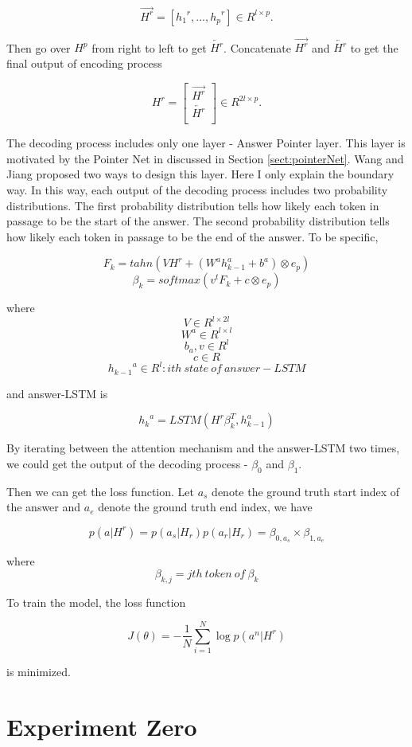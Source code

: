 \documentclass[modernstyle,12pt]{sjsuthesis}
\theoremstyle{definition}
\begin{document}
$$\overrightarrow{H^r} = [{{h_{1}}^r}, ..., {{h_{p}}^r}] \in R^{l \times p}.$$

Then go over $H^p$ from right to left to get $\overleftarrow{H^r}$. Concatenate $\overrightarrow{H^r}$ and $\overleftarrow{H^r}$ to get the final output of encoding process

\[ H^r =
\begin{bmatrix}
\overrightarrow{H^r} \\
\overleftarrow{H^r} \\
\end{bmatrix}
\in R^{2l \times p}.
\]

The decoding process includes only one layer - Answer Pointer layer. This layer is motivated by the Pointer Net in \cite{vinyals2015pointer} discussed in Section \ref{sect:pointerNet}. Wang and Jiang proposed two ways to design this layer. Here I only explain the boundary way. In this way, each output of the decoding process includes two probability distributions. The first probability distribution tells how likely each token in passage to be the start of the answer. The second probability distribution tells how likely each token in passage to be the end of the answer. To be specific,

$$F_k = tahn(VH^r + (W^a{h^a_{k-1}} +  b^a) \otimes e_p)$$
$$\beta _k = softmax(v^tF_k + c \otimes e_p)$$


where
$$V \in R^{l \times 2l}$$
$$W^a\in R^{l \times l} $$
$$b_a, v\in R^{l}  $$
$$c \in R $$
$${h_{k-1}}^a\in R^{l}: ith\ state\ of\ answer-LSTM  $$

and answer-LSTM is


$${h_k}^a = LSTM(H^r\beta _k^T, h_{k-1}^a)$$

By iterating between the attention mechanism and the answer-LSTM two times, we could get the output of the decoding process - $\beta _0$ and $\beta _1$.


Then we can get the loss function. Let $a_s$ denote the ground truth start index of the answer and $a_e$ denote the ground truth end index, we have

$$p(a|H^r) = p(a_s|H_r)p(a_r|H_r)=\beta _{0, a_s} \times \beta_{1, a_e}$$

where $$\beta_{k, j} = jth\ token\ of\ \beta _k$$

To train the model, the loss function

$$J(\theta) = -\frac{1}{N}\sum_{i=1}^{N} \log{p(a^n|H^r)} $$

is minimized.

\section{Experiment Zero} \label{sect:change_0}
\end{document}
